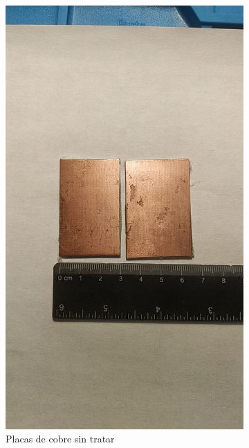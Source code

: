 \begin{figure}[!htb]
    \centering
    \begin{subfigure}[b]{.475\textwidth}
        \centering
        \includegraphics[width=1\textwidth, trim={0 400 0 400}, clip]{tfg/figuras/06_prototipado/limpiado/cobre_sin_tratar.png}
        \caption{Placas de cobre sin tratar}
        \label{fig:tfg:06:placa_de_cobre_sin_tratar}
    \end{subfigure}
    \hfill
    \begin{subfigure}[b]{.475\textwidth}

\end{subfigure}
\end{figure}
